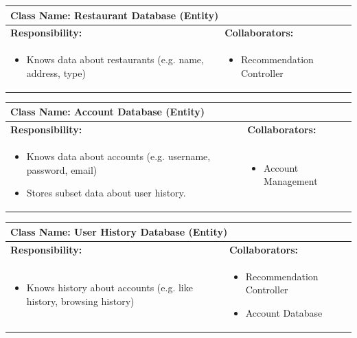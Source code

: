\documentclass[]{article}
\begin{document}

\begin{table}[H]
	\centering
	\begin{tabular}{|p{7cm}|p{7cm}|}
	\hline 
	 \multicolumn{2}{|l|}{\textbf{Class Name:} Restaurant Database (Entity) }\\
	\hline
	\textbf{Responsibility:} & \textbf{Collaborators:} \\
	\hline
	\raggedright
	\begin{itemize}
		\item Knows data about restaurants (e.g. name, address, type)
	\end{itemize}
	\vspace{1in} & 
	\begin{itemize}
		\item Recommendation Controller
	\end{itemize} \\
	\hline
	\end{tabular}
\end{table}

\begin{table}[H]
	\centering
	\begin{tabular}{|p{7cm}|p{7cm}|}
	\hline 
	 \multicolumn{2}{|l|}{\textbf{Class Name:} Account Database (Entity) }\\
	\hline
	\textbf{Responsibility:} & \textbf{Collaborators:} \\
	\hline
	\raggedright
	\begin{itemize}
		\item Knows data about accounts (e.g. username, password, email)
		\item Stores subset data about user history.
	\end{itemize}
	\vspace{1in} & 
	\begin{itemize}
		\item Account Management
	\end{itemize} \\
	\hline
	\end{tabular}
\end{table}

\begin{table}[H]
	\centering
	\begin{tabular}{|p{7cm}|p{7cm}|}
	\hline 
	 \multicolumn{2}{|l|}{\textbf{Class Name:} User History Database (Entity) }\\
	\hline
	\textbf{Responsibility:} & \textbf{Collaborators:} \\
	\hline
	\raggedright
	\begin{itemize}
		\item Knows history about accounts (e.g. like history, browsing history)
	\end{itemize}
	\vspace{1in} & 
	\begin{itemize}
		\item Recommendation Controller
		\item Account Database
	\end{itemize} \\
	\hline
	\end{tabular}
\end{table}
\end{document}
